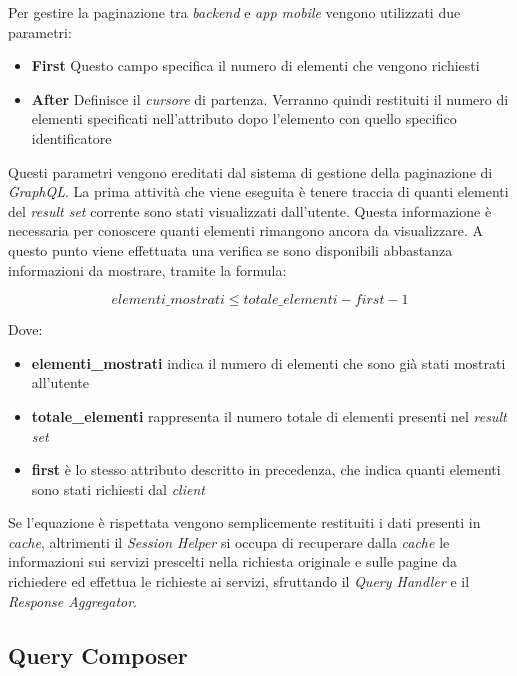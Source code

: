 Per gestire la paginazione tra \emph{backend} e \emph{app mobile} vengono utilizzati due parametri:

\begin{itemize}
	\item \textbf{First}
	Questo campo specifica il numero di elementi che vengono richiesti
	\item \textbf{After}
	Definisce il \emph{cursore} di partenza. Verranno quindi restituiti il numero di elementi specificati nell'attributo  dopo l'elemento con quello specifico identificatore
\end{itemize}

Questi parametri vengono ereditati dal sistema di gestione della paginazione di \emph{GraphQL}. La prima attività che viene eseguita è tenere traccia di quanti elementi del \emph{result set} corrente sono stati visualizzati dall'utente. Questa informazione è necessaria per conoscere quanti elementi rimangono ancora da visualizzare. A questo punto viene effettuata una verifica se sono disponibili abbastanza informazioni da mostrare, tramite la formula:

\begin{equation}
	elementi\_mostrati \le totale\_elementi - first - 1
\end{equation}

Dove:

\begin{itemize}
	\item \textbf{elementi\_mostrati}
	indica il numero di elementi che sono già stati mostrati all'utente
	\item \textbf{totale\_elementi}
	rappresenta il numero totale di elementi presenti nel \emph{result set}
	\item \textbf{first}
	è lo stesso attributo descritto in precedenza, che indica quanti elementi sono stati richiesti dal \emph{client}
\end{itemize}

Se l'equazione è rispettata vengono semplicemente restituiti i dati presenti in \emph{cache}, altrimenti il \emph{Session Helper} si occupa di recuperare dalla \emph{cache} le informazioni sui servizi prescelti nella richiesta originale e sulle pagine da richiedere ed effettua le richieste ai servizi, sfruttando il \emph{Query Handler} e il \emph{Response Aggregator}.

\subsection{Query Composer\label{sec:query-composer}}


